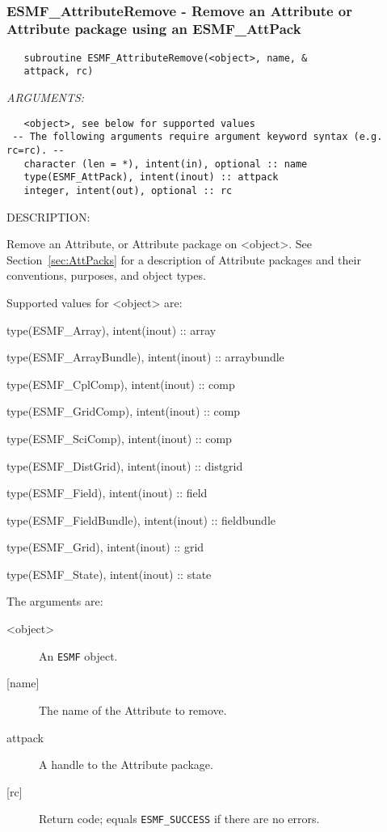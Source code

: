 \mbox{}\hrulefill\ 
 
\subsubsection [ESMF\_AttributeRemove] {ESMF\_AttributeRemove - Remove an Attribute or Attribute package using an ESMF\_AttPack}


  
\begin{verbatim}   subroutine ESMF_AttributeRemove(<object>, name, &
   attpack, rc)\end{verbatim}{\em ARGUMENTS:}
\begin{verbatim}   <object>, see below for supported values
 -- The following arguments require argument keyword syntax (e.g. rc=rc). --
   character (len = *), intent(in), optional :: name
   type(ESMF_AttPack), intent(inout) :: attpack
   integer, intent(out), optional :: rc\end{verbatim}
{\sf DESCRIPTION:\\ }


   Remove an Attribute, or Attribute package on <object>.
   See Section~\ref{sec:AttPacks} for a description of Attribute packages
   and their conventions, purposes, and object types.
  
   Supported values for <object> are:
   \begin{description}
   \item type(ESMF\_Array), intent(inout) :: array
   \item type(ESMF\_ArrayBundle), intent(inout) :: arraybundle
   \item type(ESMF\_CplComp), intent(inout) :: comp
   \item type(ESMF\_GridComp), intent(inout) :: comp
   \item type(ESMF\_SciComp), intent(inout) :: comp
   \item type(ESMF\_DistGrid), intent(inout) :: distgrid
   \item type(ESMF\_Field), intent(inout) :: field
   \item type(ESMF\_FieldBundle), intent(inout) :: fieldbundle
   \item type(ESMF\_Grid), intent(inout) :: grid
   \item type(ESMF\_State), intent(inout) :: state
   \end{description}
  
   The arguments are:
   \begin{description}
   \item [<object>]
   An {\tt ESMF} object.
   \item [{[name]}]
   The name of the Attribute to remove.
   \item [attpack]
   A handle to the Attribute package.
   \item [{[rc]}]
   Return code; equals {\tt ESMF\_SUCCESS} if there are no errors.
   \end{description}
  

